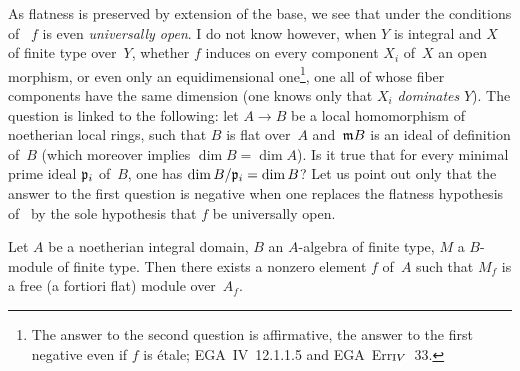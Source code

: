 \begin{remarksstar}
As flatness is preserved by extension of the base, we see that
under the conditions of~ $f$ is even
\emph{universally open}. I do not know however, when $Y$ is
integral and $X$ of finite type over~$Y$, whether $f$ induces on every
component $X_i$ of~$X$ an open morphism, or even only an
equidimensional one\footnote{The answer to the second question is
affirmative, the answer to the first negative even if $f$
is \'etale; \cf EGA~IV~12.1.1.5 and EGA~Err$_{\rm IV}$~33.},
\ie
one all of whose fiber components have the same dimension (one knows
only that $X_i$ \emph{dominates} $Y$). The question is linked
to the following: let $A\to B$ be a local homomorphism of noetherian
local rings, such that $B$ is flat over~$A$ and~$\goth{m}B$
is an ideal of definition of~$B$ (which moreover implies
$\dim B=\dim A$). Is it true that for every minimal prime
ideal $\goth{p}_i$ of~$B$, one has $\dim B/\goth{p}_i=\dim B$?
Let us point out only that the answer to the first question
is negative when one replaces the flatness hypothesis
of~ by the sole hypothesis that $f$ be
universally open.
\end{remarksstar}

\begin{lemma}
\label{IV.6.7}
Let $A$ be a noetherian integral domain, $B$ an
$A$-algebra of finite type, $M$ a $B$-module of finite type. Then
there exists a nonzero element $f$ of~$A$ such that $M_f$ is a
free (a fortiori flat) module over~$A_f$.
\end{lemma}

